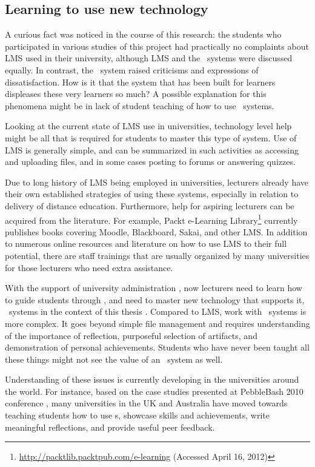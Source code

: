 \subsection[Learning to Use New Technology]{Learning to use new technology}

A curious fact was noticed in the course of this research: the students who
participated in various studies of this project had practically no complaints
about LMS used in their university, although LMS and the \ep~systems were
discussed equally. In contrast, the \ep~system raised criticisms and expressions
of dissatisfaction. How is it that the system that has been built for learners
displeases these very learners so much? A possible explanation for this
phenomena might be in lack of student teaching of how to use \ep~systems.

Looking at the current state of LMS use in universities, technology level help
might be all that is required for students to master this type of system. Use of
LMS is generally simple, and can be summarized in such activities as accessing
and uploading files, and in some cases posting to forums or answering quizzes.

Due to long history of LMS being employed in universities, lecturers already
have their own established strategies of using these systems, especially in
relation to delivery of distance education. Furthermore, help for aspiring
lecturers can be acquired from the literature. For example, Packt e-Learning
Library\footnote{\url{http://packtlib.packtpub.com/e-learning} (Accessed April
16, 2012)} currently publishes books covering Moodle, Blackboard, Sakai, and
other LMS. In addition to numerous online resources and literature on how to use
LMS to their full potential, there are staff trainings that are usually
organized by many universities for those lecturers who need extra assistance.

With the support of university administration \citep{DiBenedetto2005}, now
lecturers need to learn how to guide students through \LLLsn, and need to master
new technology that supports it, \ep~systems in the context of this thesis
\citep{Levin2008}. Compared to LMS, work with \ep~systems is more complex. It
goes beyond simple file management and requires understanding of the importance
of reflection, purposeful selection of artifacts, and demonstration of personal
achievements. Students who have never been taught all these things might not see
the value of an \ep~system as well.

Understanding of these issues is currently developing in the universities
around the world. For instance, based on the case studies presented at
PebbleBash 2010 conference \citep{PebbleLearningLtd2010a}, many universities in
the UK and Australia have moved towards teaching students how to use \ep s,
showcase skills and achievements, write meaningful reflections, and provide
useful peer feedback.

